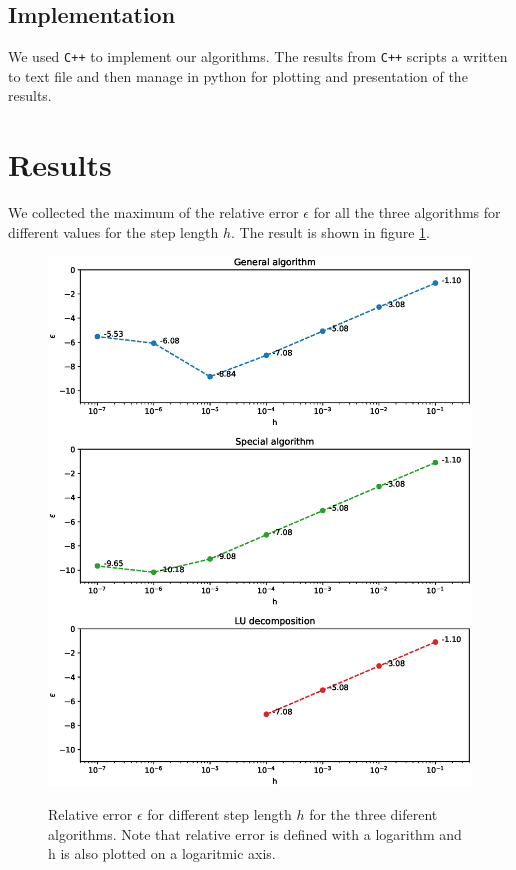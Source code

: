 \documentclass[american,a4paper,12pt]{article}
\begin{document}
\subsection{Implementation}
We used \verb!C++! to implement our algorithms. The results from \verb!C++! scripts a written to text file and then manage in python for plotting and presentation of the results.
\section{Results}
  We collected the maximum of the relative error $\epsilon$ for all the three algorithms for different values for the step length $h$. The result is shown in figure \ref{fig:max_err}.
  \begin{figure}[H]
  \begin{center}
    \includegraphics[width = \textwidth]{figures/max_err.eps} \\
    \caption{Relative error $\epsilon$ for different step length $h$ for the three diferent algorithms. Note that relative error is defined with a logarithm and h is also plotted on a logaritmic axis.}
    \label{fig:max_err}
    \end{center}
  \end{figure}
\end{document}
